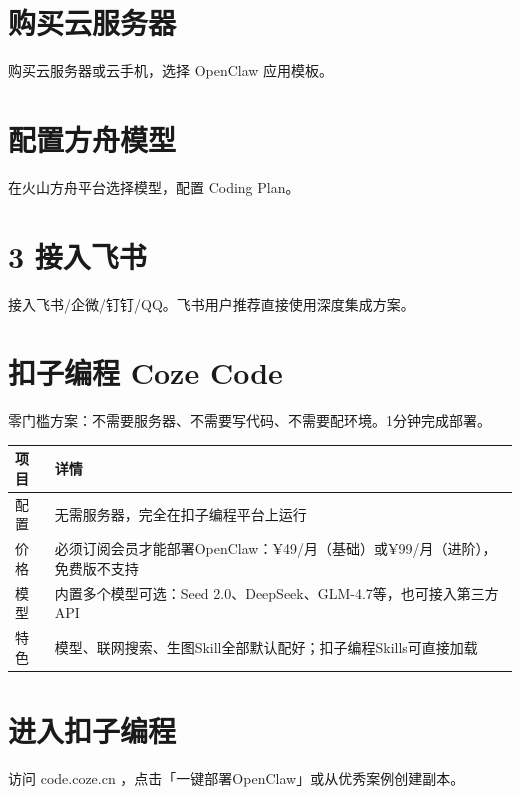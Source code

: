 \documentclass[
  10
]{article}
\newcounter{none} %
\begin{document}
\section{购买云服务器}\label{ux8d2dux4e70ux4e91ux670dux52a1ux5668}

购买云服务器或云手机，选择 OpenClaw 应用模板。

\section{配置方舟模型}\label{ux914dux7f6eux65b9ux821fux6a21ux578b}

在火山方舟平台选择模型，配置 Coding Plan。

\section{3 接入飞书}\label{ux63a5ux5165ux98deux4e66}

接入飞书/企微/钉钉/QQ。飞书用户推荐直接使用深度集成方案。

\section{扣子编程 Coze Code}\label{ux6263ux5b50ux7f16ux7a0b-coze-code}

零门槛方案：不需要服务器、不需要写代码、不需要配环境。1分钟完成部署。

{\def\LTcaptype{none} %
\begin{longtable}[]{@{}|l|l|@{}}
\toprule\noalign{}
\endhead
\bottomrule\noalign{}
\endlastfoot
\hline
项目 & 详情 \\
\hline
配置 & 无需服务器，完全在扣子编程平台上运行 \\
\hline
价格 &
必须订阅会员才能部署OpenClaw：¥49/月（基础）或¥99/月（进阶），免费版不支持 \\
\hline
模型 & 内置多个模型可选：Seed
2.0、DeepSeek、GLM-4.7等，也可接入第三方API \\
\hline
特色 &
模型、联网搜索、生图Skill全部默认配好；扣子编程Skills可直接加载 \\
\hline
\end{longtable}
}

\section{进入扣子编程}\label{ux8fdbux5165ux6263ux5b50ux7f16ux7a0b}

访问 code.coze.cn ，点击「一键部署OpenClaw」或从优秀案例创建副本。
\end{document}
